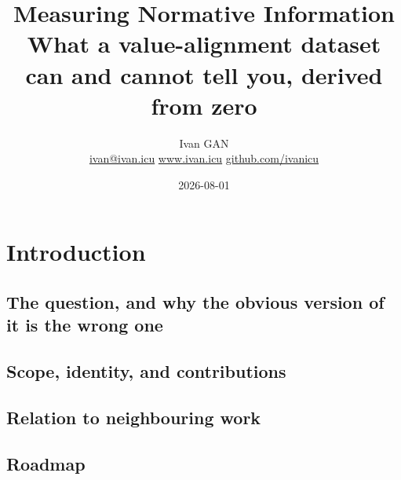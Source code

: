 

\title{\sffamily\bfseries Measuring Normative Information\\[0.35em]
  {\large\mdseries What a value-alignment dataset can and cannot tell you, derived from zero}}
\author{\sffamily Ivan GAN\\[3pt]
\small\mdseries
\href{mailto:ivan@ivan.icu}{ivan@ivan.icu}
\quad
\href{https://www.ivan.icu}{www.ivan.icu}
\quad
\href{https://github.com/ivanicu}{github.com/ivanicu}}
\date{2026-08-01}


\maketitle

\begin{abstract}
\end{abstract}

\section{Introduction}
\subsection{The question, and why the obvious version of it is the wrong one}
\subsection{Scope, identity, and contributions}
\subsection{Relation to neighbouring work}
\subsection{Roadmap}

